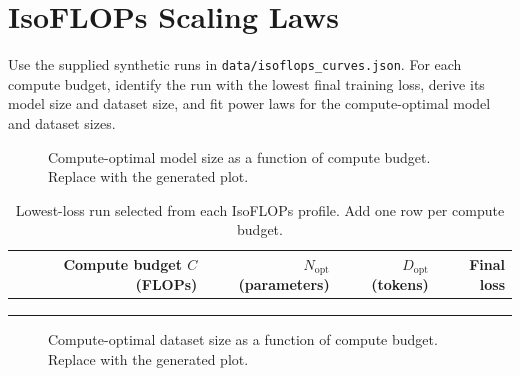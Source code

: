 \section{IsoFLOPs Scaling Laws}
\label{sec:isoflops}


Use the supplied synthetic runs in \texttt{data/isoflops\_curves.json}. For each compute budget, identify the run with the lowest final training loss, derive its model size and dataset size, and fit power laws for the compute-optimal model and dataset sizes.

\begin{figure}[htbp]
\centering
{}
\caption{Compute-optimal model size as a function of compute budget. Replace with the generated plot.}
\label{fig:isoflops-model-size}
\end{figure}
\begin{table}[htbp]
\centering\small
\begin{tabular}{@{}rrrr@{}}
\toprule
Compute budget $C$ (FLOPs) & $N_{\mathrm{opt}}$ (parameters) & $D_{\mathrm{opt}}$ (tokens) & Final loss \\
\midrule
 & & & \\
 & & & \\
 & & & \\
\bottomrule
\end{tabular}
\caption{Lowest-loss run selected from each IsoFLOPs profile. Add one row per compute budget.}
\label{tab:isoflops-optima}
\end{table}
\answer

\begin{figure}[htbp]
\centering
{}
\caption{Compute-optimal dataset size as a function of compute budget. Replace with the generated plot.}
\label{fig:isoflops-dataset-size}
\end{figure}
\answer
